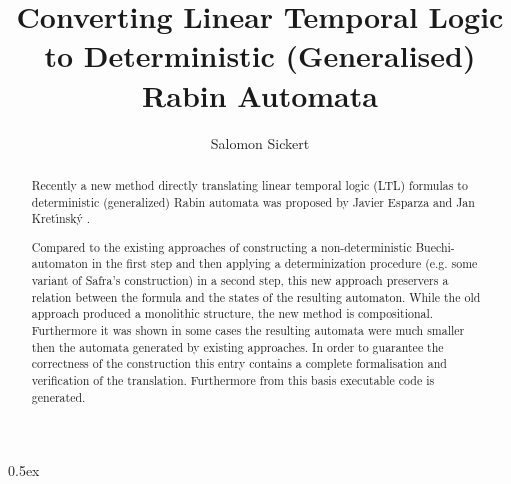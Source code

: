 \documentclass[11pt,a4paper]{article}
\begin{document}
\title{Converting Linear Temporal Logic to Deterministic (Generalised) Rabin Automata}
\author{Salomon Sickert}
\maketitle

\begin{abstract}
Recently a new method directly translating linear temporal logic (LTL) formulas to deterministic (generalized) Rabin automata was proposed by Javier Esparza and Jan Kret{\'{\i}}nsk{\'{y}} \cite{DBLP:conf/cav/EsparzaK14}. 

Compared to the existing approaches of constructing a non-deterministic Buechi-automaton in the first step and then applying a determinization procedure (e.g. some variant of Safra's construction) in a second step, this new approach preservers a relation between the formula and the states of the resulting automaton. While the old approach produced a monolithic structure, the new method is compositional. Furthermore it was shown in some cases the resulting automata were much smaller then the automata generated by existing approaches. In order to guarantee the correctness of the construction this entry contains a complete formalisation and verification of the translation. Furthermore from this basis executable code is generated.
\end{abstract}

\tableofcontents

\parindent 0pt\parskip 0.5ex





\end{document}
